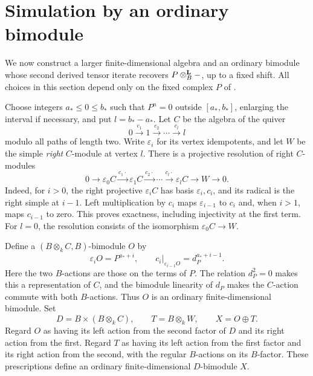 \section{Simulation by an ordinary bimodule}
\label{sec:ordinary-simulation}

We now construct a larger finite-dimensional algebra and an ordinary
bimodule whose second derived tensor iterate recovers \(P\otimes^{\mathbf L}_B-\),
up to a fixed shift. All choices in this section depend only on the
fixed complex \(P\) of .

Choose integers \(a_*\le 0\le b_*\) such that \(P^n=0\) outside
\([a_*,b_*]\), enlarging the interval if necessary, and put
\(l=b_*-a_*\).
Let \(C\) be the algebra of the quiver
\[
0\xrightarrow{c_1}1\xrightarrow{c_2}\cdots
\xrightarrow{c_l}l
\]
modulo all paths of length two.
Write \(\varepsilon_i\) for its vertex idempotents, and let \(W\)
be the simple \emph{right} \(C\)-module at vertex \(l\).
There is a projective resolution of right \(C\)-modules
\begin{equation}
\label{eq:right-chain-resolution}
0\longrightarrow \varepsilon_0C
\xrightarrow{c_1\cdot}\varepsilon_1C
\xrightarrow{c_2\cdot}\cdots
\xrightarrow{c_l\cdot}\varepsilon_lC
\longrightarrow W\longrightarrow0.
\end{equation}
Indeed, for \(i>0\), the right projective \(\varepsilon_iC\)
has basis \(\varepsilon_i,c_i\), and its radical is the right
simple at \(i-1\).  Left multiplication by \(c_i\) maps
\(\varepsilon_{i-1}\) to \(c_i\) and, when \(i>1\), maps
\(c_{i-1}\) to zero.  This proves exactness, including injectivity
at the first term.  For \(l=0\), the resolution consists of
the isomorphism \(\varepsilon_0C\to W\).

Define a \((B\otimes_k C,B)\)-bimodule \(O\) by
\[
\varepsilon_iO=P^{a_*+i},
\qquad
c_i\big|_{\varepsilon_{i-1}O}=d_P^{a_*+i-1}.
\]
Here the two \(B\)-actions are those on the terms of \(P\).
The relation \(d_P^2=0\) makes this a representation of \(C\),
and the bimodule linearity of \(d_P\) makes the \(C\)-action
commute with both \(B\)-actions.  Thus \(O\) is an ordinary
finite-dimensional bimodule.  Set
\[
D=B\times(B\otimes_k C),\qquad
T=B\otimes_k W,\qquad X=O\oplus T.
\]
Regard \(O\) as having its left action from the second factor
of \(D\) and its right action from the first.  Regard \(T\)
as having its left action from the first factor and its
right action from the second, with the regular \(B\)-actions
on its \(B\)-factor.  These prescriptions define an ordinary
finite-dimensional \(D\)-bimodule \(X\).

